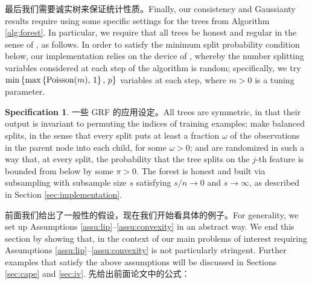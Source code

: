 \documentclass[aos]{imsart}
\theoremstyle{plain}
\theoremstyle{definition}
\newtheorem{spec}{Specification}
\theoremstyle{remark}
\begin{document}
\begin{CJK}{UTF8}{gbsn}
最后我们需要诚实树来保证统计性质。Finally, our consistency and Gaussianty results require using some specific settings
for the trees from Algorithm \ref{alg:forest}.
In particular, we require that all trees be honest and regular in the sense of \citet{wager2015estimation}, as follows.
In order to satisfy the minimum split probability condition below,
our implementation relies on the device of \citet{denil2014narrowing}, whereby the number splitting variables
considered at each step of the algorithm is random; specifically, we try
$\min\left\{\max\left\{\text{Poisson$(m)$}, \, 1\right\}, \, p\right\}$ variables at each step,
where $m > 0$ is a tuning parameter.




\begin{spec}
\label{spec:forest}
一些 GRF 的应用设定。All trees are symmetric, in that their output is invariant to permuting
the indices of training examples;
make balanced splits, in the sense that every split puts at least a fraction $\omega$ of the observations in the parent node into each child, for some $\omega > 0$; and
are randomized in such a way that, at every split, the probability that
the tree splits on the $j$-th feature is bounded from below by some $\pi > 0$.
The forest is honest and built via subsampling
with subsample size $s$ satisfying $s/n \rightarrow 0$ and $s \rightarrow \infty$,
as described in Section \ref{sec:implementation}.
\end{spec}

前面我们给出了一般性的假设，现在我们开始看具体的例子。For generality, we set up Assumptions \ref{assu:lip}--\ref{assu:convexity}
in an abstract way. We end this section by showing that, in the context of our main problems of interest requiring Assumptions \ref{assu:lip}--\ref{assu:convexity} is
not particularly stringent. Further examples that satisfy the above assumptions will be discussed in Sections \ref{sec:cape} and \ref{sec:iv}. 先给出前面论文中的公式：


\end{CJK}
\end{document}
